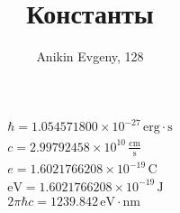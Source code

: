 \documentclass{article}
\title{Константы}
\author{Anikin Evgeny, 128}
\begin{document}
    \begin{equation}
        \begin{gathered}
            \hbar = 1.054571800\times10^{-27}\, \mathrm{erg}\cdot\mathrm{s}\\
            c = 2.99792458\times 10^{10}\, \frac{\mathrm{cm}}{\mathrm{s}}\\
            e = 1.6021766208\times 10^{-19}\, \mathrm{C}\\
            \mathrm{eV} = 1.6021766208\times 10^{-19}\, \mathrm{J}\\
            2\pi\hbar c = 1239.842\, \mathrm{eV}\cdot\mathrm{nm}\\
        \end{gathered}
    \end{equation}
\end{document}

